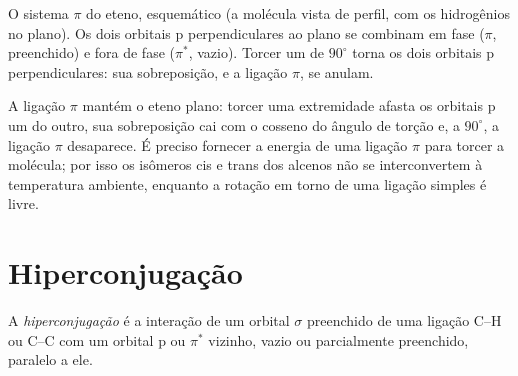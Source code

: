 \begin{omfigure}

{\small O sistema $\pi$ do eteno, esquemático (a molécula vista de perfil, com
os hidrogênios no plano). Os dois orbitais p perpendiculares ao plano se
combinam em fase ($\pi$, preenchido) e fora de fase ($\pi^*$, vazio). Torcer
um  de $90^\circ$ torna os dois orbitais p perpendiculares: sua
sobreposição, e a ligação $\pi$, se anulam.}
\end{omfigure}

A ligação $\pi$ mantém o eteno plano: torcer uma extremidade afasta os orbitais
p um do outro, sua sobreposição cai com o cosseno do ângulo de torção e, a
$90^\circ$, a ligação $\pi$ desaparece. É preciso fornecer a energia de uma
ligação $\pi$ para torcer a molécula; por isso os isômeros cis e trans dos
alcenos não se interconvertem à temperatura ambiente, enquanto a rotação em
torno de uma ligação simples é livre.

\section{Hiperconjugação}

\begin{definition}[Hiperconjugação]\label{def:b2:fragment-orbitals:hyperconjugation}
A \emph{hiperconjugação} é a interação de um orbital
$\sigma$ preenchido de uma ligação C--H ou C--C com um orbital p ou $\pi^*$
vizinho, vazio ou parcialmente preenchido, paralelo a ele.
\end{definition}

